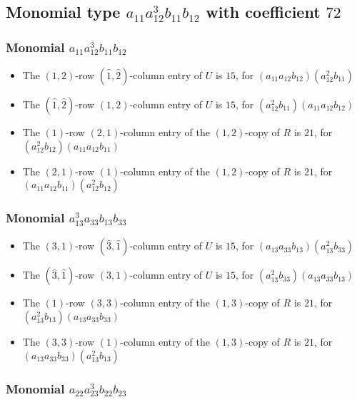 \documentclass{article}
\begin{document}
\subsection{Monomial type $ a_{11} a_{12}^{3} b_{11} b_{12} $ with coefficient $ 72 $}

\subsubsection{Monomial $ a_{11} a_{12}^{3} b_{11} b_{12} $}

\begin{itemize}
\item The $ \left(1, 2\right) $-row $ (\hat{1}, \hat{2}) $-column entry of $U$ is $ 15 $, for $( a_{11} a_{12} b_{12} )( a_{12}^{2} b_{11} )$ 
\item The $(\hat{1}, \hat{2})$-row $ \left(1, 2\right) $-column entry of $U$ is $ 15 $, for $( a_{12}^{2} b_{11} )( a_{11} a_{12} b_{12} )$ 
\item The $(1)$-row $(2, 1)$-column entry of the $ \left(1, 2\right) $-copy of $R$ is $ 21 $, for $( a_{12}^{2} b_{12} )( a_{11} a_{12} b_{11} )$ 
\item The $(2, 1)$-row $(1)$-column entry of the $ \left(1, 2\right) $-copy of $R$ is $ 21 $, for $( a_{11} a_{12} b_{11} )( a_{12}^{2} b_{12} )$ 
\end{itemize}
\subsubsection{Monomial $ a_{13}^{3} a_{33} b_{13} b_{33} $}

\begin{itemize}
\item The $ \left(3, 1\right) $-row $ (\hat{3}, \hat{1}) $-column entry of $U$ is $ 15 $, for $( a_{13} a_{33} b_{13} )( a_{13}^{2} b_{33} )$ 
\item The $(\hat{3}, \hat{1})$-row $ \left(3, 1\right) $-column entry of $U$ is $ 15 $, for $( a_{13}^{2} b_{33} )( a_{13} a_{33} b_{13} )$ 
\item The $(1)$-row $(3, 3)$-column entry of the $ \left(1, 3\right) $-copy of $R$ is $ 21 $, for $( a_{13}^{2} b_{13} )( a_{13} a_{33} b_{33} )$ 
\item The $(3, 3)$-row $(1)$-column entry of the $ \left(1, 3\right) $-copy of $R$ is $ 21 $, for $( a_{13} a_{33} b_{33} )( a_{13}^{2} b_{13} )$ 
\end{itemize}
\subsubsection{Monomial $ a_{22} a_{23}^{3} b_{22} b_{23} $}
\end{document}
